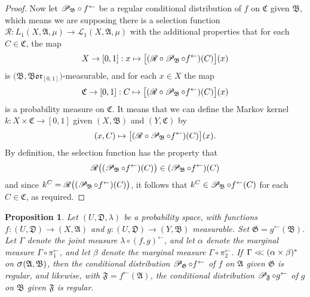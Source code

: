 \documentclass[
twoside=true,
paper=letter,
fontsize=9pt,
pagesize=auto,
leqno,
openany,
headsepline,
overfullrule,
]{scrbook}
\theoremstyle{plain}
\theoremstyle{plain}
\newtheorem{prop}[thm]{Proposition}
\theoremstyle{definition}
\theoremstyle{bfnoteitalic}
\theoremstyle{bfnoteroman}
\newcommand{\sigalg}[1]{\mathfrak{#1}}
\newcommand{\cali}[1]{\mathscr{#1}}
\newcommand{\condprobop}[1]{\mathop{\cali{P}\hspace{-1pt}}\nolimits_{#1}}
\newcommand{\borel}{\mathfrak{Bor}}
\newcommand{\sagb}{\mathop{\hbox{\large{$\sigma$}}}\nolimits}
\newcommand{\preimage}[1]{#1^{\leftarrow}}
\newcommand{\sigmaalgebra}{\sigalg{A}}
\newcommand{\sigmaalgebraii}{\sigalg{B}}
\newcommand{\sigmaalgebraiii}{\sigalg{C}}
\newcommand{\productsig}[2]{\sagb(#1,#2)}
\newcommand{\Lone}{L_1(\measurespace, \sigmaalgebra, \measure)}
\newcommand{\caliLone}{\cali{L}_1(\measurespace, \sigmaalgebra, \measure)}
\newcommand{\funcf}{f}
\newcommand{\funcg}{g}
\newcommand{\function}{f}
\newcommand{\measurespace}{X}
\newcommand{\measurespaceii}{Y}
\newcommand{\mspaceelt}{x}
\newcommand{\abscont}{\mathrel{< \kern-3.5pt <}}
\newcommand{\measure}{\mu}
\newcommand{\measlambda}{\lambda}
\newcommand{\setiii}{C}
\newcommand{\regular}{\cali{R}}
\newcommand{\projectionone}{\pi_1}
\newcommand{\projectiontwo}{\pi_2}
\newcommand{\markovkernel}{k}
\newcommand{\uspace}{U}%
\newcommand{\uspacesig}{\sigalg{D}}
\newcommand{\measonprod}{\Gamma}%
\newcommand{\marginalone}{\alpha}%
\newcommand{\marginaltwo}{\beta}%
\begin{document}
\begin{proof}
Now let 
${\condprobop{\sigmaalgebraii}}\circ \preimage{\function}$ 
be a regular conditional distribution of 
$\function$ on $\sigmaalgebraiii$ given $\sigmaalgebraii$, which means we are supposing there is a selection function
$\regular:\Lone\to\caliLone$
with the additional properties that for each
$\setiii\in\sigmaalgebraiii$, the map 
\[
\measurespace\to [0,1] : \mspaceelt\mapsto
\bigl[ (\regular\circ\condprobop{\sigmaalgebraii}\circ\preimage{\function}) (\setiii)\bigr](\mspaceelt)
\]
is $\bigl(\sigmaalgebraii, \borel_{[0,1]}\bigr)$\hyp{}measurable, and for each 
$\mspaceelt\in\measurespace$ the  map
\[
\sigmaalgebraiii\to [0,1]: \setiii \mapsto 
\bigl[ (\regular\circ\condprobop{\sigmaalgebraii}\circ\preimage{\function}) (\setiii)\bigr](\mspaceelt)
\]
is a probability measure on $\sigmaalgebraiii$.
It means that we can define the Markov kernel
$\markovkernel:\measurespace\times\sigmaalgebraiii\to [0,1]$ 
given $(\measurespace, \sigmaalgebraii)$ and $(\measurespaceii, \sigmaalgebraiii)$
by 
\[
(\mspaceelt,\setiii)
\mapsto
\bigl[ (\regular\circ\condprobop{\sigmaalgebraii}\circ\preimage{\function}) (\setiii)\bigr](\mspaceelt).
\]
By definition, the selection function has the property that 
\[
\regular
\bigl((\condprobop{\sigmaalgebraii}\circ\preimage{\function}) (\setiii)\bigr)
\in
(\condprobop{\sigmaalgebraii}\circ\preimage{\function}) (\setiii)
\]
and since 
$k^{\setiii}
=
\regular
\bigl((\condprobop{\sigmaalgebraii}\circ\preimage{\function}) (\setiii)\bigr)$,
it follows that
$k^{\setiii} \in
\condprobop{\sigmaalgebraii}\circ \preimage{\function}(\setiii)$ for each 
$\setiii\in\sigmaalgebraiii$, as required.
\end{proof}



\begin{prop}\label{absolute_continuity_regular}
Let
$(\uspace, \uspacesig, \measlambda)$
be a probability space, with functions
$\funcf:(\uspace,\uspacesig)\to (\measurespace,\sigmaalgebra)$
and
$\funcg:(\uspace,\uspacesig)\to (\measurespaceii,\sigmaalgebraii)$
measurable.
Set
$\sigalg{G} = \preimage{\funcg}(\sigmaalgebraii)$.
Let $\measonprod$ denote the joint measure
$\measlambda\circ\preimage{({\funcf,\funcg})}$,
and let $\marginalone$  denote the marginal measure $\measonprod\circ \preimage{\projectionone}$,
and let $\marginaltwo$ denote the marginal measure $\measonprod\circ \preimage{\projectiontwo}$.
If\,
$\measonprod \abscont (\marginalone\times\marginaltwo)^*$
on
$\productsig{\sigmaalgebra}{\sigmaalgebraii}$,
then the conditional distribution
$\condprobop{\sigalg{G}}\circ \preimage{\funcf}$ of $\funcf$ on
$\sigmaalgebra$ given $\sigalg{G}$ is regular, and likewise, with
$\sigalg{F} = \preimage{\funcf}(\sigmaalgebra)$, the conditional distribution
$\condprobop{\sigalg{F}}\circ \preimage{\funcg}$ of $\funcg$ on
$\sigmaalgebraii$ given $\sigalg{F}$ is regular.
\end{prop}
\end{document}

